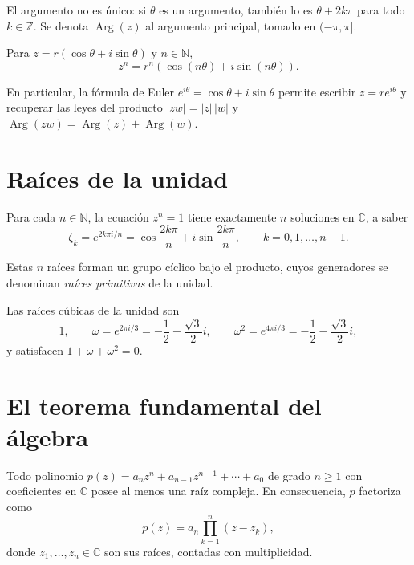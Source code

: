 El argumento no es único: si $\theta$ es un argumento, también lo es $\theta+2k\pi$ para todo $k\in\mathbb{Z}$. Se denota $\operatorname{Arg}(z)$ al argumento principal, tomado en $(-\pi,\pi]$.

\begin{theorem}
\label{teo:demoivre}
Para $z=r(\cos\theta+i\sin\theta)$ y $n\in\mathbb{N}$,
\[
  z^n=r^n(\cos(n\theta)+i\sin(n\theta)).
\]
\end{theorem}

En particular, la fórmula de Euler $e^{i\theta}=\cos\theta+i\sin\theta$ permite escribir $z=re^{i\theta}$ y recuperar las leyes del producto $|zw|=|z|\,|w|$ y $\operatorname{Arg}(zw)=\operatorname{Arg}(z)+\operatorname{Arg}(w)$.

\section{Raíces de la unidad}

\begin{theorem}
\label{teo:raices-unidad}
Para cada $n\in\mathbb{N}$, la ecuación $z^n=1$ tiene exactamente $n$ soluciones en $\mathbb{C}$, a saber
\[
  \zeta_k=e^{2k\pi i/n}=\cos\frac{2k\pi}{n}+i\sin\frac{2k\pi}{n},\qquad k=0,1,\dots,n-1.
\]
\end{theorem}

Estas $n$ raíces forman un grupo cíclico bajo el producto, cuyos generadores se denominan \emph{raíces primitivas} de la unidad.

\begin{example}
Las raíces cúbicas de la unidad son
\[
  1,\qquad \omega=e^{2\pi i/3}=-\frac12+\frac{\sqrt3}{2}i,\qquad \omega^2=e^{4\pi i/3}=-\frac12-\frac{\sqrt3}{2}i,
\]
y satisfacen $1+\omega+\omega^2=0$.
\end{example}

\section{El teorema fundamental del álgebra}

\begin{theorem}
\label{teo:fundamental-algebra}
Todo polinomio $p(z)=a_nz^n+a_{n-1}z^{n-1}+\cdots+a_0$ de grado $n\geq 1$ con coeficientes en $\mathbb{C}$ posee al menos una raíz compleja. En consecuencia, $p$ factoriza como
\[
  p(z)=a_n\prod_{k=1}^{n}(z-z_k),
\]
donde $z_1,\dots,z_n\in\mathbb{C}$ son sus raíces, contadas con multiplicidad.
\end{theorem}

